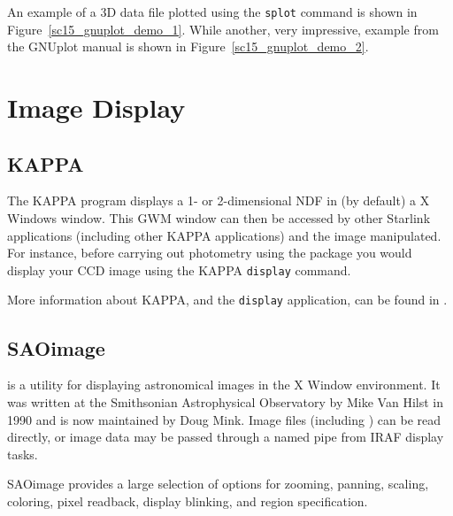 \documentclass[twoside,11pt]{starlink}
\begin{document}
An example of a 3D data file plotted using the \texttt{splot} command is
shown in Figure~\ref{sc15_gnuplot_demo_1}. While another, very
impressive, example from the GNUplot manual is shown in
Figure~\ref{sc15_gnuplot_demo_2}.



\section{Image Display\label{sc15_image}}

\subsection{KAPPA\label{sc15_kappa}}

The KAPPA  program displays a 1-
or 2-dimensional NDF in (by default) a  X Windows
window. This GWM window can then be accessed by other Starlink
applications (including other KAPPA applications) and the image
manipulated. For instance, before carrying out photometry using the
 package you would display your CCD image using
the KAPPA \texttt{display} command.

More information about KAPPA, and the \texttt{display} application, can
be found in .

\subsection{SAOimage\label{sc15_saoimage}}

is a utility for displaying astronomical images in the X Window
environment. It was written at the Smithsonian Astrophysical
Observatory by Mike Van Hilst in 1990 and is now maintained by Doug
Mink. Image files (including ) can be read
directly, or image data may be passed through a named pipe from IRAF
display tasks.

SAOimage provides a large selection of options for zooming, panning,
scaling, coloring, pixel readback, display blinking, and region
specification.
\end{document}
